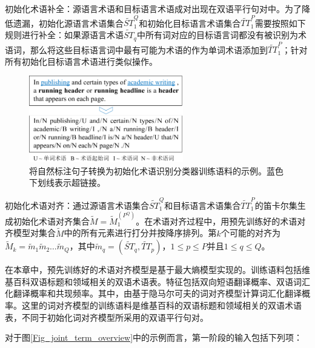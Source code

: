 初始化术语补全：源语言术语和目标语言术语成对出现在双语平行句对中。为了降低遗漏，初始化源语言术语集合$\widetilde{ST}_1^Q$和初始化目标语言术语集合$\widetilde{TT}_1^P$需要按照如下规则进行补全：如果源语言术语$\widetilde{ST}_q$中所有词对应的目标语言词都没有被识别为术语词，那么将这些目标语言词中最有可能为术语的作为单词术语添加到$\widetilde{TT}_1^P$；针对所有初始化目标语言术语进行类似操作。

\begin{figure}[!tb]
	\centering
	\includegraphics[width=0.6\textwidth]{Figure/Figure_4_3.pdf}
	\caption{将自然标注句子转换为初始化术语识别分类器训练语料的示例。蓝色下划线表示超链接。}
	\label{Fig_joint_training_example}
\end{figure}

初始化术语对齐：通过源语言术语集合$\widetilde{ST}_1^Q$和目标语言术语集合$\widetilde{TT}_1^P$的笛卡尔集生成初始化术语对齐集合$\widetilde{M}=\widetilde{M}_1^{(P^Q)}$。在术语对齐过程中，用预先训练好的术语对齐模型对集合$\widetilde{M}$中的所有元素进行打分并按降序排列。第$k$个可能的对齐为$\widetilde{M}_k=\widetilde{m}_1\widetilde{m}_2\ldots\widetilde{m}_Q  $，其中$\widetilde{m}_q=(\widetilde{ST}_q, \widetilde{TT}_p)$，$1 \le p \le P$并且$1 \le q \le Q$。

在本章中，预先训练好的术语对齐模型是基于最大熵模型实现的。训练语料包括维基百科双语标题和领域相关的双语术语表。特征包括双向短语翻译概率、双语词汇化翻译概率和共现频率。其中，由基于隐马尔可夫的词对齐模型计算词汇化翻译概率。这里的词对齐模型的训练语料是维基百科的双语标题和领域相关的双语术语表，不同于初始化词对齐模型所采用的双语平行句对。

对于图\ref{Fig_joint_term_overview}中的示例而言，第一阶段的输入包括下列项：

